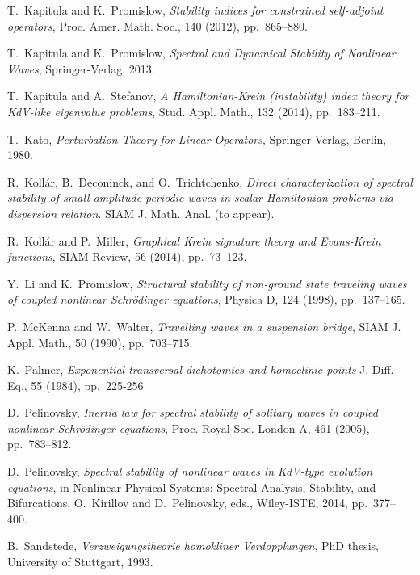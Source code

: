 \documentclass[review,onefignum,onetabnum]{siamart171218}
\begin{document}
\begin{thebibliography}{10}
{\sc T.~Kapitula and K.~Promislow}, {\em Stability indices for constrained
  self-adjoint operators}, Proc. Amer. Math. Soc., 140 (2012), pp.~865--880.

{\sc T.~Kapitula and K.~Promislow}, {\em Spectral and Dynamical Stability of
  Nonlinear Waves}, Springer-Verlag, 2013.

{\sc T.~Kapitula and A.~Stefanov}, {\em A {Hamiltonian-Krein} (instability)
  index theory for {KdV}-like eigenvalue problems}, Stud. Appl. Math., 132
  (2014), pp.~183--211.

{\sc T.~Kato}, {\em {Perturbation Theory for Linear Operators}},
  Springer-Verlag, Berlin, 1980.

{\sc R.~Koll\'ar, B.~Deconinck, and O.~Trichtchenko}, {\em Direct
  characterization of spectral stability of small amplitude periodic waves in
  scalar {H}amiltonian problems via dispersion relation}.
\newblock SIAM J. Math. Anal. (to appear).

{\sc R.~Koll\'ar and P.~Miller}, {\em Graphical {K}rein signature theory and
  {Evans-Krein} functions}, SIAM Review, 56 (2014), pp.~73--123.

{\sc Y.~Li and K.~Promislow}, {\em Structural stability of non-ground state
  traveling waves of coupled nonlinear {S}chr\"odinger equations}, Physica D,
  124 (1998), pp.~137--165.

{\sc P.~McKenna and W.~Walter}, {\em Travelling waves in a suspension bridge},
  {SIAM} J. Appl. Math., 50 (1990), pp.~703--715.

{\sc K.~Palmer},
{\em Exponential transversal dichotomies and homoclinic points}
J. Diff. Eq., 55 (1984), pp.~225-256

{\sc D.~Pelinovsky}, {\em Inertia law for spectral stability of solitary waves
  in coupled nonlinear {S}chr\"odinger equations}, Proc. Royal Soc. London A,
  461 (2005), pp.~783--812.

{\sc D.~Pelinovsky}, {\em Spectral stability of nonlinear waves in {KdV}-type
  evolution equations}, in Nonlinear Physical Systems: Spectral Analysis,
  Stability, and Bifurcations, O.~Kirillov and D.~Pelinovsky, eds., Wiley-ISTE,
  2014, pp.~377--400.

{\sc B.~Sandstede}, {\em Verzweigungstheorie homokliner Verdopplungen}, PhD
  thesis, University of Stuttgart, 1993.


\end{thebibliography}
\end{document}

